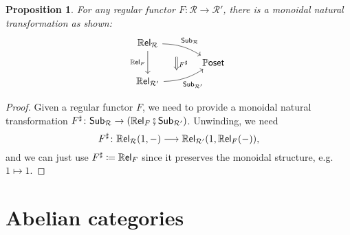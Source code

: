 \documentclass[11pt, oneside, article]{memoir}
\theoremstyle{plain}
\newtheorem{proposition}[theorem]{Proposition}
\theoremstyle{definition}
\theoremstyle{remark}
\newcommand{\cat}[1]{\mathcal{#1}}%
\newcommand{\Cat}[1]{{\mathsf{#1}}}%
\newcommand{\CCat}[1]{\mathbb{\StrLeft{#1}{1}}\Cat{\StrGobbleLeft{#1}{1}}}%
\newcommand{\Funr}[1]{\mathsf{#1}}%
\newcommand{\sub}{\Funr{Sub}}
\newcommand{\cp}{\mathbin{\fatsemi}}
\newcommand{\too}{\longrightarrow}
\newcommand{\rrel}[1]{\CCat{Rel}_{#1}}
\newcommand{\pposet}{\CCat{Poset}}
\begin{document}
\begin{proposition}\label{prop.reg_functor_sub}
For any regular functor $F\colon\cat{R}\to\cat{R}'$, there is a monoidal natural transformation as shown:
\[
\begin{tikzcd}[row sep=5pt, column sep=large]
	\rrel{\cat{R}}\ar[rd, bend left=15pt, pos=.4, "\sub_{\cat{R}}", ""' name=P]\ar[dd, "\rrel{F}"']\\&
	\pposet\\
	\rrel{\cat{R}'}\ar[ru, bend right=15pt, pos=.4, "\sub_{\cat{R}'}"', "" name=P']
	\ar[from=P, to=P|-P', shorten <=7pt, shorten >=7pt, Rightarrow, "F^\sharp"]
\end{tikzcd}
\]
\end{proposition}
\begin{proof}
Given a regular functor $F$, we need to provide a monoidal natural transformation $F^\sharp\colon\sub_{\cat{R}}\to(\rrel{F}\cp\sub_{\cat{R}'})$. Unwinding, we need
\[F^\sharp\colon\rrel{\cat{R}}(1,-)\too\rrel{\cat{R}'}(1,\rrel{F}(-)),\]
and we can just use $F^\sharp\coloneqq\rrel{F}$ since it preserves the monoidal structure, e.g.\ $1\mapsto 1$.
\end{proof}


\section{Abelian categories}
\end{document}
